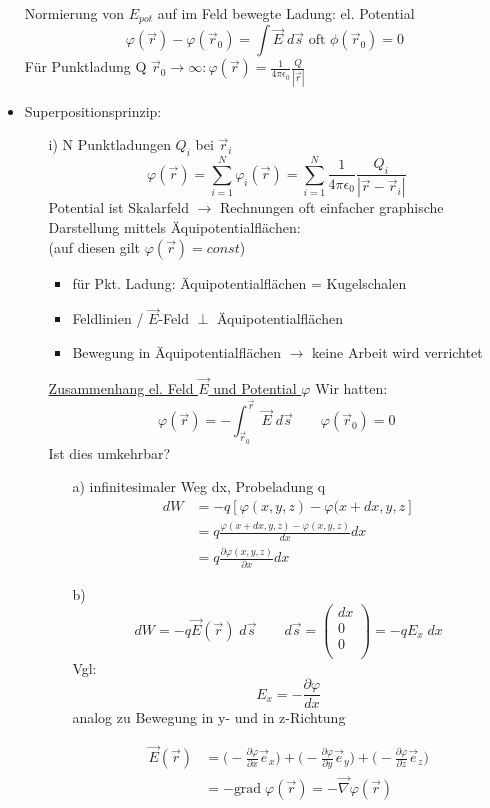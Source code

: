 \documentclass[titlepage,12pt,a4paper,ngerman]{report}
\begin{document}
\begin{itemize}
Normierung von $E_{pot}$ auf im Feld bewegte Ladung:
el. Potential 
$$\varphi(\vec{r}) - \varphi (\vec{r}_0) = \int \vec{E} \; d \vec{s} \textrm{ oft } \phi(\vec{r}_0) = 0$$
Für Punktladung Q $\vec{r}_0 \rightarrow \infty : \varphi(\vec{r}) = \frac{1}{4\pi\epsilon_0} \frac{Q}{|\vec{r}|}$\\
\item Superpositionsprinzip:
\begin{itemize}
\item[i)] N Punktladungen $Q_i$ bei $\vec{r}_i$
$$ \varphi(\vec{r}) = \sum_{i=1}^N \varphi_i(\vec{r}) = \sum_{i=1}^N \frac{1}{4\pi\epsilon_0} \frac{Q_i}{|\vec{r}-\vec{r}_i|}$$
Potential ist Skalarfeld $\rightarrow$ Rechnungen oft einfacher graphische Darstellung mittels Äquipotentialflächen: \\
(auf diesen gilt $\varphi(\vec{r}) = const$)
\begin{itemize}
\item für Pkt. Ladung: Äquipotentialflächen = Kugelschalen
\item Feldlinien / $\vec{E}$-Feld $\perp$ Äquipotentialflächen
\item Bewegung in Äquipotentialflächen $\rightarrow$ keine Arbeit wird verrichtet
\end{itemize}
\underline{Zusammenhang el. Feld $\vec{E}$ und Potential $\varphi$}
Wir hatten: $$\varphi(\vec{r}) = - \int_{\vec{r}_0}^{\vec{r}} \vec{E} \; d \vec{s} \qquad \varphi(\vec{r}_0) = 0$$
Ist dies umkehrbar?
\begin{itemize}
\item[a)] infinitesimaler Weg dx, Probeladung q
\begin{align*}
dW &= -q [ \varphi(x,y,z) - \varphi(x + dx,y,z] \\[10pt]
&= q \frac{\varphi(x+dx,y,z) - \varphi(x,y,z)}{dx} dx \\[10pt]
& = q \frac{\partial \varphi(x,y,z)}{\partial x} dx
\end{align*}
\item[b)] $$dW = -q \vec{E}(\vec{r}) \; d\vec{s} \qquad d\vec{s} = \begin{pmatrix}
dx\\
0\\
0\\
\end{pmatrix} = -q E_x\;dx$$
Vgl: $$E_x = -\frac{\partial \varphi}{dx}$$
analog zu Bewegung in y- und in z-Richtung

\begin{align*}
\vec{E} (\vec{r}) &=  \bigg( - \frac{\partial \varphi}{\partial x} \vec{e}_x \bigg) + \bigg( - \frac{\partial \varphi}{\partial y} \vec{e}_y \bigg) + \bigg( - \frac{\partial \varphi}{\partial z} \vec{e}_z \bigg)\\[10pt]
&= -\textrm{grad}\; \varphi(\vec{r}) = - \vec{\nabla} \varphi(\vec{r})
\end{align*}


\end{itemize}
\end{itemize}
\end{itemize}
\end{document}
